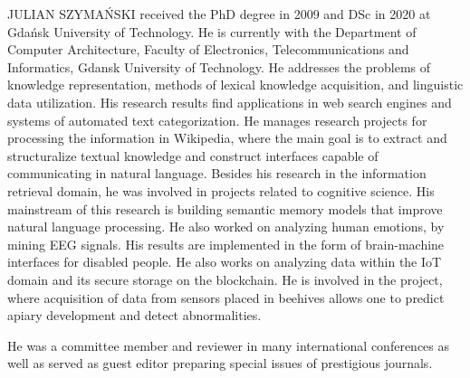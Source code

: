 \documentclass{ieeeaccess}
\begin{document}
\begin{IEEEbiography}{JULIAN SZYMA{\'N}SKI}  received the PhD degree in 2009 and DSc in 2020 at Gdańsk University of Technology.
He is currently with the Department of Computer
Architecture, Faculty of Electronics, Telecommunications and Informatics, Gdansk University of Technology. He addresses the problems of knowledge representation, methods of lexical knowledge acquisition, and linguistic data utilization.
His research results find applications in web search engines and systems of automated text categorization. He manages research projects for processing the information in Wikipedia, where the main goal is to extract and structuralize textual knowledge and construct interfaces capable of communicating in natural language. Besides his research in the information retrieval domain, he was involved in projects related to cognitive science. His mainstream of this research is building semantic memory models that improve natural language processing. He also worked on analyzing human emotions, by mining EEG signals. His results are implemented in the form of brain-machine interfaces for disabled people. He also works on analyzing data within the IoT domain and its secure storage on the blockchain. 
He is involved in the project, where acquisition of data from sensors placed in beehives  allows one to predict apiary development and detect abnormalities. 

He was a committee member and reviewer in  many international
conferences as well as served as guest editor preparing special issues of prestigious journals. 
\end{IEEEbiography}
\end{document}
